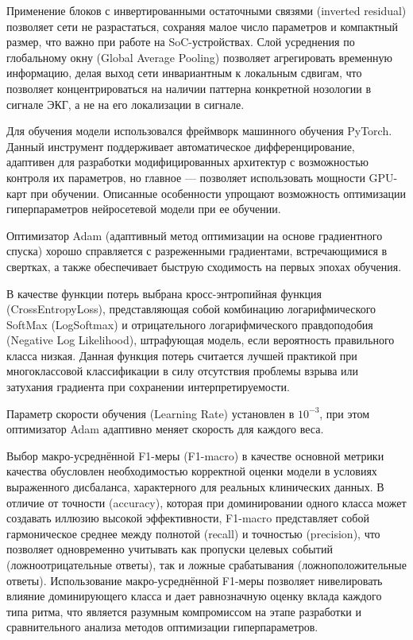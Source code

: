 \documentclass[10pt,a4paper]{book}
\begin{document}
Применение блоков с инвертированными остаточными связями (inverted residual) позволяет сети не разрастаться, сохраняя малое число параметров и компактный размер, что важно при работе на SoC-устройствах. Слой усреднения по глобальному окну (Global Average Pooling) позволяет агрегировать временную информацию, делая выход сети инвариантным к локальным сдвигам, что позволяет концентрироваться на наличии паттерна конкретной нозологии в сигнале ЭКГ, а не на его локализации в сигнале.

Для обучения модели использовался фреймворк машинного обучения PyTorch. Данный инструмент поддерживает автоматическое дифференцирование, адаптивен для разработки модифицированных архитектур с возможностью контроля их параметров, но главное --- позволяет использовать мощности GPU-карт при обучении. Описанные особенности упрощают возможность оптимизации гиперпараметров нейросетевой модели при ее обучении.

Оптимизатор Adam (адаптивный метод оптимизации на основе градиентного спуска) хорошо справляется с разреженными градиентами, встречающимися в свертках, а также обеспечивает быструю сходимость на первых эпохах обучения.

В качестве функции потерь выбрана кросс-энтропийная функция (CrossEntropyLoss), представляющая собой комбинацию логарифмического SoftMax (LogSoftmax) и отрицательного логарифмического правдоподобия (Negative Log Likelihood), штрафующая модель, если вероятность правильного класса низкая. Данная функция потерь считается лучшей практикой при многоклассовой классификации в силу отсутствия проблемы взрыва или затухания градиента при сохранении интерпретируемости.

Параметр скорости обучения (Learning Rate) установлен в $10^{-3}$, при этом оптимизатор Adam адаптивно меняет скорость для каждого веса.

Выбор макро-усреднённой F1-меры (F1-macro) в качестве основной метрики качества обусловлен необходимостью корректной оценки модели в условиях выраженного дисбаланса, характерного для реальных клинических данных. В отличие от точности (accuracy), которая при доминировании одного класса может создавать иллюзию высокой эффективности, F1-macro представляет собой гармоническое среднее между полнотой (recall) и точностью (precision), что позволяет одновременно учитывать как пропуски целевых событий (ложноотрицательные ответы), так и ложные срабатывания (ложноположительные ответы). Использование макро-усреднённой F1-меры позволяет нивелировать влияние доминирующего класса и дает равнозначную оценку вклада каждого типа ритма, что является разумным компромиссом на этапе разработки и сравнительного анализа методов оптимизации гиперпараметров.
\end{document}

